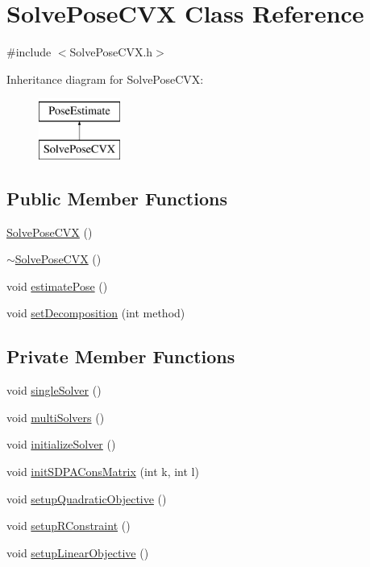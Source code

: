\hypertarget{classSolvePoseCVX}{\section{\-Solve\-Pose\-C\-V\-X \-Class \-Reference}
\label{classSolvePoseCVX}
}


{\ttfamily \#include $<$\-Solve\-Pose\-C\-V\-X.\-h$>$}

\-Inheritance diagram for \-Solve\-Pose\-C\-V\-X\-:\begin{figure}[H]
\begin{center}
\leavevmode
\includegraphics[height=2.000000cm]{classSolvePoseCVX}
\end{center}
\end{figure}
\subsection*{\-Public \-Member \-Functions}
\begin{DoxyCompactItemize}
\item 
\hyperlink{classSolvePoseCVX_a482baaffc4162260c7e565b1fa623007}{\-Solve\-Pose\-C\-V\-X} ()
\item 
\hyperlink{classSolvePoseCVX_a00a0ef0e4c0c55bde6d63c03c496082d}{$\sim$\-Solve\-Pose\-C\-V\-X} ()
\item 
void \hyperlink{classSolvePoseCVX_a081c857ff6c1c9e6597d41fb08bb6f16}{estimate\-Pose} ()
\item 
void \hyperlink{classSolvePoseCVX_a413870a9249a7f3b2ceb0ba52f68cb5f}{set\-Decomposition} (int method)
\end{DoxyCompactItemize}
\subsection*{\-Private \-Member \-Functions}
\begin{DoxyCompactItemize}
\item 
void \hyperlink{classSolvePoseCVX_ac6c5c12f31943c02eac2b4e3afe95cb5}{single\-Solver} ()
\item 
void \hyperlink{classSolvePoseCVX_aa15afe19bca14542c1466f4582a8408a}{multi\-Solvers} ()
\item 
void \hyperlink{classSolvePoseCVX_af71375a8ebc356e5794249ae0c1243d6}{initialize\-Solver} ()
\item 
void \hyperlink{classSolvePoseCVX_aadfc695ad82f44103e7e51c037ddb232}{init\-S\-D\-P\-A\-Cons\-Matrix} (int k, int l)
\item 
void \hyperlink{classSolvePoseCVX_ac1b83848a5b98e008dfc9b7a87b0079c}{setup\-Quadratic\-Objective} ()
\item 
void \hyperlink{classSolvePoseCVX_a4e1c078bdb3a613349c7136bdb0899b9}{setup\-R\-Constraint} ()
\item 
void \hyperlink{classSolvePoseCVX_adba2454a08d9e6115cd075928c1d5518}{setup\-Linear\-Objective} ()
\end{DoxyCompactItemize}
